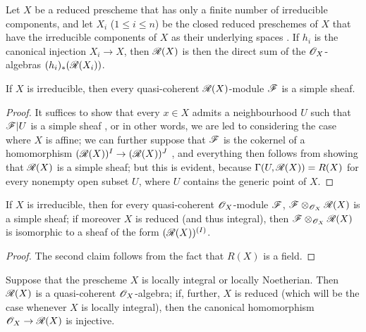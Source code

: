\begin{cor}[7.3.4]
\label{1.7.3.4}
Let $X$ be a reduced prescheme that has only a finite number of irreducible components, and let $X_i$ ($1\leq i\leq n$) be the closed reduced preschemes of $X$ that have the irreducible components of $X$ as their underlying spaces .
If $h_i$ is the canonical injection $X_i\to X$, then $\mathscr{R}(X)$ is then the direct sum of the $\mathscr{O}_X$-algebras $(h_i)_*(\mathscr{R}(X_i))$.
\end{cor}

\begin{cor}[7.3.5]
\label{1.7.3.5}
If $X$ is irreducible, then every quasi-coherent $\mathscr{R}(X)$-module $\mathscr{F}$ is a simple sheaf.
\end{cor}

\begin{proof}
\label{proof-1.7.3.5}
It suffices to show that every $x\in X$ admits a neighbourhood $U$ such that $\mathscr{F}|U$ is a simple sheaf , or in other words, we are led to considering the case where $X$ is affine; we can further suppose that $\mathscr{F}$ is the cokernel of a homomorphism $(\sh{R}(X))^{I}\to(\sh{R}(X))^{J}$ , and everything then follows from showing that $\mathscr{R}(X)$ is a simple sheaf; but this is evident, because $\Gamma(U,\mathscr{R}(X))=R(X)$ for every nonempty open subset $U$, where $U$ contains the generic point of $X$.
\end{proof}

\begin{cor}[7.3.6]
\label{1.7.3.6}
If $X$ is irreducible, then for every quasi-coherent $\mathscr{O}_X$-module $\mathscr{F}$, $\mathscr{F}\otimes_{\mathscr{O}_X}\mathscr{R}(X)$ is a simple sheaf; if moreover $X$ is reduced (and thus integral), then $\mathscr{F}\otimes_{\mathscr{O}_X}\mathscr{R}(X)$ is isomorphic to a sheaf of the form $(\mathscr{R}(X))^{(I)}$.
\end{cor}

\begin{proof}
\label{proof-1.7.3.6}
The second claim follows from the fact that $R(X)$ is a field.
\end{proof}

\begin{prop}[7.3.7]
\label{1.7.3.7}
Suppose that the prescheme $X$ is locally integral or locally Noetherian.
Then $\mathscr{R}(X)$ is a quasi-coherent $\mathscr{O}_X$-algebra; if, further, $X$ is reduced (which will be the case whenever $X$ is locally integral), then the canonical homomorphism $\OO_X\to\sh{R}(X)$ is injective.
\end{prop}

